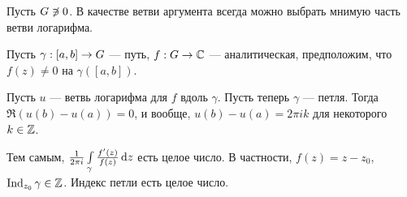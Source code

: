 \documentclass[a4paper]{report}
\begin{document}
    Пусть $G \not\hspace{0.13pt}\ni 0$.
    В качестве ветви аргумента всегда можно выбрать мнимую часть ветви логарифма.

    Пусть $\gamma: [a, b] \rightarrow G$ --- путь, $f: G \rightarrow \mathbb{C}$ --- аналитическая, предположим, что $f(z) \ne 0$ на $\gamma([a, b])$.

    Пусть $u$ --- ветвь логарифма для $f$ вдоль $\gamma$.
    Пусть теперь $\gamma$ --- петля.
    Тогда $\Re(u(b) - u(a)) = 0$, и вообще, $u(b) - u(a) = 2\pi i k$ для некоторого $k \in \mathbb{Z}$.
    
    Тем самым, $\frac1{2\pi i}\int\limits_{\gamma} \frac{f'(z)}{f(z)}\operatorname{d}\! z$ есть целое число. В частности, $f(z) = z - z_0$, $\operatorname{Ind}_{z_0} \gamma \in \mathbb{Z}$. Индекс петли есть целое число.
\end{document}
